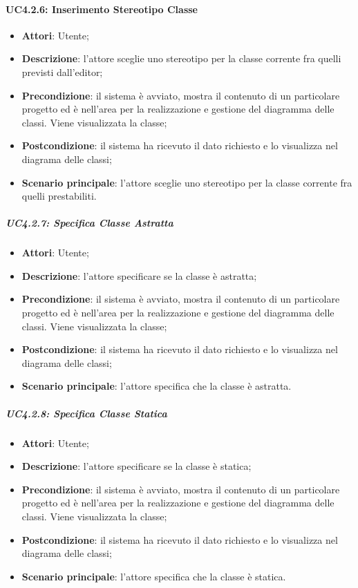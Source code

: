 \paragraph{UC4.2.6: Inserimento Stereotipo Classe}
\label{UC4.2.6}
\begin{itemize}
	\item \textbf{Attori}: Utente;
	\item \textbf{Descrizione}: l'attore sceglie uno stereotipo per la classe corrente fra quelli previsti dall'editor;
	\item \textbf{Precondizione}: il sistema è avviato, mostra il contenuto di un particolare progetto ed è nell'area per la realizzazione e gestione del diagramma delle classi. Viene visualizzata la classe;
	\item \textbf{Postcondizione}: il sistema ha ricevuto il dato richiesto e lo visualizza nel diagrama delle classi;
	\item \textbf{Scenario principale}: l'attore sceglie uno stereotipo per la classe corrente fra quelli prestabiliti.
\end{itemize}

\subparagraph{UC4.2.7: Specifica Classe Astratta}
\label{UC4.2.7}
\begin{itemize}
	\item \textbf{Attori}: Utente;
	\item \textbf{Descrizione}: l'attore specificare se la classe è astratta;
	\item \textbf{Precondizione}: il sistema è avviato, mostra il contenuto di un particolare progetto ed è nell'area per la realizzazione e gestione del diagramma delle classi. Viene visualizzata la classe;
	\item \textbf{Postcondizione}: il sistema ha ricevuto il dato richiesto e lo visualizza nel diagrama delle classi;
	\item \textbf{Scenario principale}: l'attore specifica che la classe è astratta.
\end{itemize}

\subparagraph{UC4.2.8: Specifica Classe Statica}
\label{UC4.2.8}
\begin{itemize}
	\item \textbf{Attori}: Utente;
	\item \textbf{Descrizione}: l'attore specificare se  la classe è statica;
	\item \textbf{Precondizione}: il sistema è avviato, mostra il contenuto di un particolare progetto ed è nell'area per la realizzazione e gestione del diagramma delle classi. Viene visualizzata la classe;
	\item \textbf{Postcondizione}: il sistema ha ricevuto il dato richiesto e lo visualizza nel diagrama delle classi;
	\item \textbf{Scenario principale}: l'attore specifica che la classe è statica.
\end{itemize}

